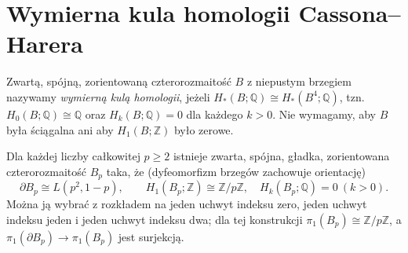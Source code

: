 \begin{center}
\end{center}

\section{Wymierna kula homologii Cassona--Harera}
\label{sec:tg-rb-rational-ball}

\begin{definicja}
Zwartą, spójną, zorientowaną czterorozmaitość
$B$ z niepustym brzegiem nazywamy
\emph{wymierną kulą homologii}, jeżeli
$H_*(B;\mathbb Q)\cong H_*(B^4;\mathbb Q)$,
tzn. $H_0(B;\mathbb Q)\cong\mathbb Q$ oraz
$H_k(B;\mathbb Q)=0$ dla każdego $k>0$.
Nie wymagamy, aby $B$ była ściągalna ani
aby $H_1(B;\mathbb Z)$ było zerowe.
\end{definicja}

\begin{twierdzenie}
\label{thm:tg-rb-casson-harer}
Dla każdej liczby całkowitej $p\geq2$ istnieje
zwarta, spójna, gładka, zorientowana
czterorozmaitość $B_p$ taka, że (dyfeomorfizm
brzegów zachowuje orientację)
\[
\partial B_p\cong L(p^2,1-p),\qquad
H_1(B_p;\mathbb Z)\cong\mathbb Z/p\mathbb Z,
\quad H_k(B_p;\mathbb Q)=0\ (k>0).
\]
Można ją wybrać z rozkładem na jeden uchwyt
indeksu zero, jeden uchwyt indeksu jeden i jeden
uchwyt indeksu dwa; dla tej konstrukcji
$\pi_1(B_p)\cong\mathbb Z/p\mathbb Z$, a
$\pi_1(\partial B_p)\to\pi_1(B_p)$ jest surjekcją.
\end{twierdzenie}

